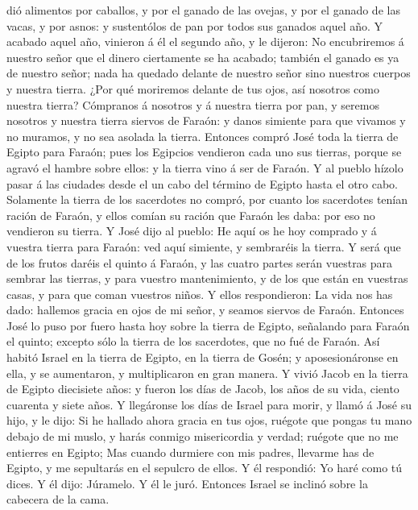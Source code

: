 dió alimentos por caballos, y por el ganado de las ovejas, y por el
ganado de las vacas, y por asnos: y sustentólos de pan por todos sus
ganados aquel año.  Y acabado aquel año, vinieron á él el
segundo año, y le dijeron: No encubriremos á nuestro señor que el dinero
ciertamente se ha acabado; también el ganado es ya de nuestro señor;
nada ha quedado delante de nuestro señor sino nuestros cuerpos y nuestra
tierra.  ¿Por qué moriremos delante de tus ojos, así
nosotros como nuestra tierra? Cómpranos á nosotros y á nuestra tierra
por pan, y seremos nosotros y nuestra tierra siervos de Faraón: y danos
simiente para que vivamos y no muramos, y no sea asolada la tierra.
 Entonces compró José toda la tierra de Egipto para
Faraón; pues los Egipcios vendieron cada uno sus tierras, porque se
agravó el hambre sobre ellos: y la tierra vino á ser de Faraón.
 Y al pueblo hízolo pasar á las ciudades desde el un cabo
del término de Egipto hasta el otro cabo.  Solamente la
tierra de los sacerdotes no compró, por cuanto los sacerdotes tenían
ración de Faraón, y ellos comían su ración que Faraón les daba: por eso
no vendieron su tierra.  Y José dijo al pueblo: He aquí
os he hoy comprado y á vuestra tierra para Faraón: ved aquí simiente, y
sembraréis la tierra.  Y será que de los frutos daréis el
quinto á Faraón, y las cuatro partes serán vuestras para sembrar las
tierras, y para vuestro mantenimiento, y de los que están en vuestras
casas, y para que coman vuestros niños.  Y ellos
respondieron: La vida nos has dado: hallemos gracia en ojos de mi señor,
y seamos siervos de Faraón.  Entonces José lo puso por
fuero hasta hoy sobre la tierra de Egipto, señalando para Faraón el
quinto; excepto sólo la tierra de los sacerdotes, que no fué de Faraón.
 Así habitó Israel en la tierra de Egipto, en la tierra
de Gosén; y aposesionáronse en ella, y se aumentaron, y multiplicaron en
gran manera.  Y vivió Jacob en la tierra de Egipto
diecisiete años: y fueron los días de Jacob, los años de su vida, ciento
cuarenta y siete años.  Y llegáronse los días de Israel
para morir, y llamó á José su hijo, y le dijo: Si he hallado ahora
gracia en tus ojos, ruégote que pongas tu mano debajo de mi muslo, y
harás conmigo misericordia y verdad; ruégote que no me entierres en
Egipto;  Mas cuando durmiere con mis padres, llevarme has
de Egipto, y me sepultarás en el sepulcro de ellos. Y él respondió: Yo
haré como tú dices.  Y él dijo: Júramelo. Y él le juró.
Entonces Israel se inclinó sobre la cabecera de la cama.

